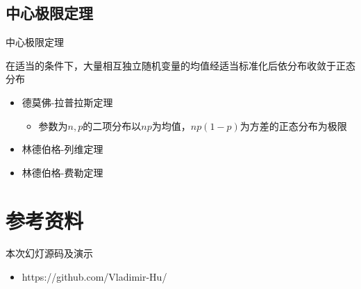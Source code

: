 \documentclass[14pt,hyperref={CJKbookmarks=true}]{beamer}
\begin{document}
\subsection{中心极限定理}
\begin{frame}{中心极限定理}
\begin{theorem}
在适当的条件下，大量相互独立随机变量的均值经适当标准化后依分布收敛于正态分布
\end{theorem}
\begin{itemize}
\item 德莫佛-拉普拉斯定理
\begin{itemize}
\item 参数为$n,p$的二项分布以$np$为均值，$np(1-p)$为方差的正态分布为极限
\end{itemize}
\item 林德伯格-列维定理
\item 林德伯格-费勒定理
\end{itemize}
\end{frame}
\section{参考资料}
\begin{frame}
本次幻灯源码及演示
\begin{itemize}
\item https://github.com/Vladimir-Hu/
\end{itemize}
\end{frame}
\end{document}
